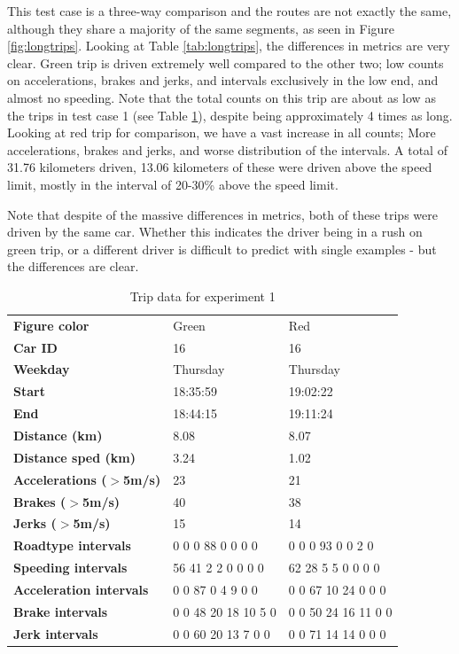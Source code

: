 This test case is a three-way comparison and the routes are not exactly the same, although they share a majority of the same segments, as seen in Figure \ref{fig:longtrips}. Looking at Table \ref{tab:longtrips}, the differences in metrics are very clear. Green trip is driven extremely well compared to the other two; low counts on accelerations, brakes and jerks, and intervals exclusively in the low end, and almost no speeding. Note that the total counts on this trip are about as low as the trips in test case 1 (see Table \ref{tab:shorttrips}), despite being approximately 4 times as long.
Looking at red trip for comparison, we have a vast increase in all counts; More accelerations, brakes and jerks, and worse distribution of the intervals. A total of 31.76 kilometers driven, 13.06 kilometers of these were driven above the speed limit, mostly in the interval of 20-30\% above the speed limit.

Note that despite of the massive differences in metrics, both of these trips were driven by the same car. Whether this indicates the driver being in a rush on green trip, or a different driver is difficult to predict with single examples - but the differences are clear.

\begin{table}
    \centering
    \begin{tabular}{>{\bfseries}l|ll|}
    Figure color             & Green               & Red                 \\
    Car ID                   & 16                  & 16                  \\
    Weekday                  & Thursday            & Thursday            \\
    Start                    & 18:35:59            & 19:02:22            \\
    End                      & 18:44:15            & 19:11:24            \\
    Distance (km)            & 8.08                & 8.07                \\
    Distance sped (km)       & 3.24                & 1.02                \\
    Accelerations ($>$5m/s)  & 23                  & 21                  \\
    Brakes ($>$5m/s)         & 40                  & 38                  \\
    Jerks ($>$5m/s)          & 15                  & 14                  \\
    Roadtype intervals       & 0 0 0 88 0 0 0 0    & 0 0 0 93 0 0 2 0    \\
    Speeding intervals       & 56 41 2 2 0 0 0 0   & 62 28 5 5 0 0 0 0   \\
    Acceleration intervals   & 0 0 87 0 4 9 0 0    & 0 0 67 10 24 0 0 0  \\
    Brake intervals          & 0 0 48 20 18 10 5 0 & 0 0 50 24 16 11 0 0 \\
    Jerk intervals           & 0 0 60 20 13 7 0 0  & 0 0 71 14 14 0 0 0  \\
    \end{tabular}
    \caption{Trip data for experiment 1}
    \label{tab:shorttrips}
\end{table}


